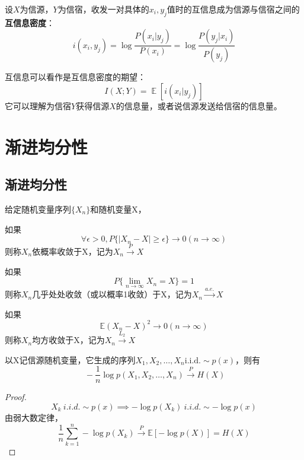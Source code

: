 \documentclass{ctexbook}
\DeclareMathOperator{\E}{\mathbb{E}}     %
\newcommand{\iid}{\text{i.i.d.}}          %
\begin{document}
\begin{definition}
    设$X$为信源，$Y$为信宿，收发一对具体的$x_i,y_j$值时的互信息成为信源与信宿之间的\textbf{互信息密度}：
    $$i(x_i,y_j)=\log\frac{P(x_i|y_j)}{P(x_i)}=\log\frac{P(y_j|x_i)}{P(y_j)}$$

    互信息可以看作是互信息密度的期望：
    $$I(X;Y)=\E[i(x_i|y_j)]$$
    它可以理解为信宿$Y$获得信源$X$的信息量，或者说信源发送给信宿的信息量。
\end{definition}

\chapter{渐进均分性}

\section{渐进均分性}

\begin{definition}[随机变量的收敛]
    给定随机变量序列$\{X_n\}$和随机变量X，

    如果$$\forall \epsilon >0,P\{|X_n - X| \geq \epsilon\} \to 0(n\to \infty)$$
    则称$X_n$依概率收敛于X，记为$X_n \xrightarrow{P} X$

    如果$$P\{\lim_{n\to \infty} X_n = X\} = 1$$
    则称$X_n$几乎处处收敛（或以概率1收敛）于X，记为$X_n \xrightarrow{a.e.} X$

    如果$$\mathbb{E} (X_n-X)^2 \to 0(n\to \infty)$$
    则称$X_n$均方收敛于X，记为$X_n \xrightarrow{L_2} X$
\end{definition}

\begin{theorem}
    以X记信源随机变量，它生成的序列$X_1,X_2,\ldots,X_n\iid\sim p(x)$，则有
    \[\ -\frac{1}{n} \log p(X_1,X_2,\ldots,X_n) \xrightarrow{P} H(X)\]
\end{theorem}
\begin{proof}
    \[X_k\ i.i.d.\sim p(x)\implies -\log p(X_k)\ i.i.d.\sim -\log p(x)\]
    由弱大数定律，
    \[\frac{1}{n} \sum_{k=1}^n -\log p(X_k) \xrightarrow{P} \mathbb{E} [-\log p(X)] = H(X)\]
\end{proof}
\end{document}
